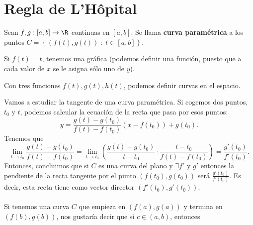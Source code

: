 \section{Regla de L'Hôpital}
\begin{fdefinition}
	\normalfont Sean $\displaystyle f,g : \left[a,b\right]  \to \R $ continuas en $\displaystyle \left[a,b\right]  $. Se llama \textbf{curva paramétrica} a los puntos $\displaystyle C = \left\{ \left(f\left(t\right), g\left(t\right)\right) \; : \; t \in \left[a,b\right] \right\}  $.
\end{fdefinition}
\begin{observation}
\normalfont Si $\displaystyle f\left(t\right) = t $, tenemos una gráfica (podemos definir una función, puesto que a cada valor de $\displaystyle x $ se le asigna sólo uno de $\displaystyle y $).
\end{observation}
\begin{observation}
\normalfont Con tres funciones $\displaystyle f\left(t\right),g\left(t\right),h\left(t\right) $, podemos definir curvas en el espacio.
\end{observation}
Vamos a estudiar la tangente de una curva paramétrica. Si cogemos dos puntos, $\displaystyle t_{0} $ y $\displaystyle t $, podemos calcular la ecuación de la recta que pasa por esos puntos:
\[y =  \frac{g\left(t\right)-g\left(t_{0}\right)}{f\left(t\right)-f\left(t_{0}\right)}\left(x-f(t_{0})\right) + g\left(t_{0}\right)   .\]
Tenemos que 
\[\lim_{t \to t_{0}}\frac{g\left(t\right)-g\left(t_{0}\right)}{f\left(t\right)-f\left(t_{0}\right)}= \lim_{t \to t_{0}} \left(\frac{g\left(t\right)-g\left(t_{0}\right)}{t-t_{0}} \cdot \frac{t - t_{0}}{f\left(t\right)-f\left(t_{0}\right)}\right) = \frac{g'\left(t_{0}\right)}{f'\left(t_{0}\right)} .\]
Entonces, concluimos que si $\displaystyle C $ es una curva del plano y $\displaystyle \exists f' $ y $\displaystyle g' $ entonces la pendiente de la recta tangente por el punto $\displaystyle \left(f\left(t_{0}\right), g\left(t_{0}\right)\right) $ será $\displaystyle \frac{g'\left(t_{0}\right)}{f'\left(t_{0}\right)} $. Es decir, esta recta tiene como vector director $\displaystyle \left(f'\left(t_{0}\right), g'\left(t_{0}\right)\right) $. \\ \\ 
Si tenemos una curva $\displaystyle C $ que empieza en $\displaystyle \left(f\left(a\right), g\left(a\right)\right) $ y termina en $\displaystyle \left(f\left(b\right), g\left(b\right)\right) $, nos gustaría decir que si $\displaystyle c \in \left(a,b\right) $, entonces

